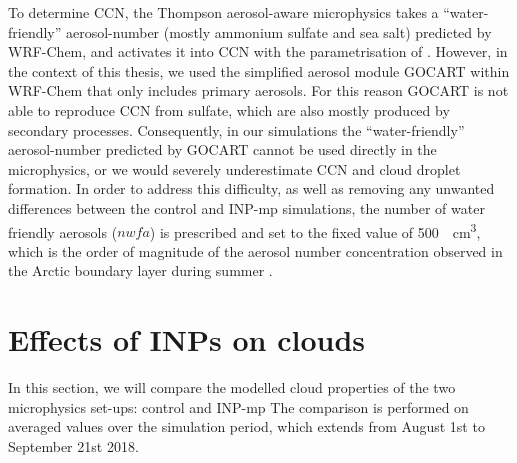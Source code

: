     To determine CCN, the Thompson aerosol-aware microphysics takes a ``water-friendly'' aerosol-number (mostly  ammonium sulfate and sea salt) predicted by WRF-Chem, and activates it into CCN with the parametrisation of \citet{thompson_study_2014}. However, in the context of this thesis, we used the simplified aerosol module GOCART within WRF-Chem that only includes primary aerosols. For this reason GOCART is not able to reproduce CCN from sulfate, which are also mostly produced  by secondary processes. Consequently, in our simulations the ``water-friendly'' aerosol-number predicted by GOCART cannot be used directly in the microphysics, or we would severely underestimate CCN and cloud droplet formation.
    In order to address this difficulty, as well as removing any unwanted differences between the control and INP-mp simulations, the number of water friendly aerosols ($nwfa$) is prescribed and set to the fixed value of \SI{500}{\per\cubic\cm}, which is the order of magnitude of the aerosol number concentration observed in the Arctic boundary layer during summer \citep{boyer_full_2023}.

    



\section{Effects of INPs on clouds}
\label{sec:effects_on_clouds}
In this section, we will compare the modelled cloud properties of the two microphysics set-ups: control and INP-mp 
The comparison is performed on averaged values over the simulation period, which extends from August 1st to September 21st 2018.

